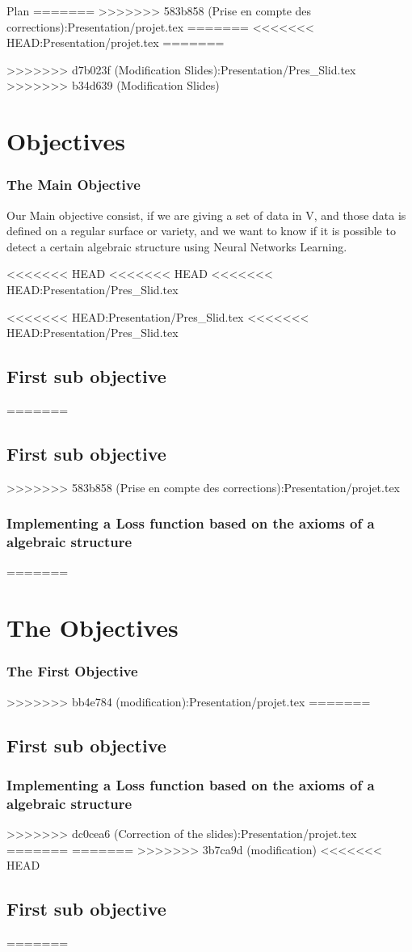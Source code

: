 \documentclass{beamer}
\begin{document}
\begin{frame}{Plan}
=======
>>>>>>> 583b858 (Prise en compte des corrections):Presentation/projet.tex
=======
<<<<<<< HEAD:Presentation/projet.tex
=======

>>>>>>> d7b023f (Modification Slides):Presentation/Pres_Slid.tex
>>>>>>> b34d639 (Modification Slides)
\section{Objectives}
\begin{frame}
    \frametitle{The Main Objective}
    Our Main objective consist,  if we are giving a set of data in V, and those data is defined on a regular surface or variety, and we want to know if it is possible to detect a certain algebraic structure using Neural Networks Learning.
\end{frame}
<<<<<<< HEAD
<<<<<<< HEAD
<<<<<<< HEAD:Presentation/Pres_Slid.tex

<<<<<<< HEAD:Presentation/Pres_Slid.tex
<<<<<<< HEAD:Presentation/Pres_Slid.tex
\subsection{First sub objective} 
=======
\subsection{First sub objective}
>>>>>>> 583b858 (Prise en compte des corrections):Presentation/projet.tex
\begin{frame}
    \frametitle{Implementing a Loss function based on the axioms of a
    algebraic structure}
=======
\section{The Objectives}
\begin{frame}
        \frametitle{The First Objective}
>>>>>>> bb4e784 (modification):Presentation/projet.tex
=======
\subsection{First sub objective} 
\begin{frame}
    \frametitle{Implementing a Loss function based on the axioms of a
    algebraic structure}
>>>>>>> dc0cea6 (Correction of the slides):Presentation/projet.tex
=======
=======
>>>>>>> 3b7ca9d (modification)
<<<<<<< HEAD
\subsection{First sub objective}
=======


\end{frame}
\end{frame}
\end{frame}
\end{frame}
\end{document}
